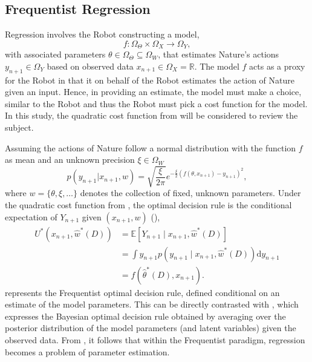 \subsection{Frequentist Regression}
\label{chp:frequentist_regression}
Regression involves the Robot constructing a model,
\begin{equation}
	f: \Omega_\Theta \times \Omega_X \to \Omega_Y,
\end{equation}
with associated parameters $\theta \in \Omega_\Theta\subseteq \Omega_W$, that estimates Nature's actions $y_{n+1}\in \Omega_Y$ based on observed data $x_{n+1}\in \Omega_X=\mathbb{R}$. The model $f$ acts as a proxy for the Robot in that it on behalf of the Robot estimates the action of Nature given an input. Hence, in providing an estimate, the model must make a choice, similar to the Robot and thus the Robot must pick a cost function for the model. In this study, the quadratic cost function from  will be considered to review the subject.


Assuming the actions of Nature follow a normal distribution with the function $f$ as mean and an unknown precision $\xi \in \Omega_{W}$
\begin{equation}
	p(y_{n+1}|x_{n+1},w)=\sqrt{\frac{\xi}{2\pi}} e^{-\frac{\xi}{2}(f(\theta,x_{n+1})-y_{n+1})^2},
	\label{freq:dist}
\end{equation}
where $w = \{\theta, \xi,\dots\}$ denotes the collection of fixed, unknown parameters. Under the quadratic cost function from , the optimal decision rule is the conditional expectation of $Y_{n+1}$ given $(x_{n+1},w)$ (),
\begin{equation}
	\begin{split}
		U^*(x_{n+1},\hat{w}^*(D)) &= \mathbb{E}[Y_{n+1} \mid x_{n+1}, \hat{w}^*(D)]\\
		&= \int y_{n+1} p(y_{n+1} \mid x_{n+1}, \hat{w}^*(D)) \mathrm{d}y_{n+1}\\
		& = f(\hat{\theta}^*(D),x_{n+1}).
	\end{split}
	\label{freq:decision}
\end{equation}
 represents the Frequentist optimal decision rule, defined conditional on an estimate of the model parameters. This can be directly contrasted with , which expresses the Bayesian optimal decision rule obtained by averaging over the posterior distribution of the model parameters (and latent variables) given the observed data. From , it follows that within the Frequentist paradigm, regression becomes a problem of parameter estimation.

